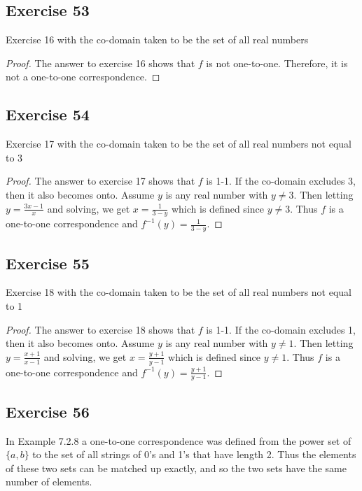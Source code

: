 \documentclass[14pt]{extarticle}
\begin{document}
\subsection{Exercise 53}
Exercise 16 with the co-domain taken to be the set of all real numbers

\begin{proof}
The answer to exercise 16 shows that $f$ is not one-to-one. Therefore, it is not a one-to-one correspondence.
\end{proof}

\subsection{Exercise 54}
Exercise 17 with the co-domain taken to be the set of all real numbers not equal to 3

\begin{proof}
The answer to exercise 17 shows that $f$ is 1-1. If the co-domain excludes 3, then it also becomes onto. Assume $y$ is
any real number with \(y \neq 3\). Then letting \(y = \frac{3x-1}{x}\) and solving, we get \(x = \frac{1}{3-y}\)
which is defined since \(y \neq 3\). Thus $f$ is a one-to-one correspondence and \(f^{-1}(y) = \frac{1}{3-y}\).
\end{proof}

\subsection{Exercise 55}
Exercise 18 with the co-domain taken to be the set of all real numbers not equal to 1

\begin{proof}
The answer to exercise 18 shows that $f$ is 1-1. If the co-domain excludes 1, then it also becomes onto. Assume $y$ is
any real number with \(y \neq 1\). Then letting \(y = \frac{x+1}{x-1}\) and solving, we get \(x=\frac{y+1}{y-1}\) 
which is defined since \(y \neq 1\). Thus $f$ is a one-to-one correspondence and \(f^{-1}(y) = \frac{y+1}{y-1}\).
\end{proof}

\subsection{Exercise 56}
In Example 7.2.8 a one-to-one correspondence was defined from the power set of $\{a, b\}$ to the set of all strings 
of 0’s and 1’s that have length 2. Thus the elements of these two sets can be matched up exactly, and so the two 
sets have the same number of elements.
\end{document}
